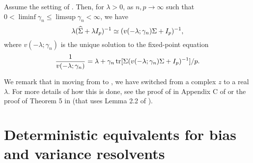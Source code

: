 \documentclass{article}
\begin{document}
\begin{corollary}
    \label{cor:basic-ridge-resolvent-equivalent-in-v}
    Assume the setting of 
    .
    Then, for $\lambda > 0$,
    as $n, p \to \infty$
    such that $0 < \liminf \gamma_n \le \limsup \gamma_n < \infty$,
    we have
    \[
        \lambda ({\widehat{\Sigma}} + \lambda I_p)^{-1}
        \simeq
        (v(-\lambda; \gamma_n) \Sigma + I_p)^{-1},
    \]
    where $v(-\lambda; \gamma_n)$
    is the unique solution to the fixed-point equation
    \[
        \frac{1}{v(-\lambda; \gamma_n)}
        =
        \lambda
        + \gamma_n \operatorname{tr}[\Sigma (v(-\lambda; \gamma_n) \Sigma + I_p)^{-1}] / p.
    \]
\end{corollary}

We remark that in moving from 
to
,
we have switched from a complex $z$ to a real $\lambda$.
For more details of how this is done,
see the proof of 
in Appendix C of \cite{patil_2022}
or the proof of Theorem 5 in \cite{hastie2022surprises}
(that uses
Lemma 2.2 of
\cite{knowles_yin_2017}).


\section{Deterministic equivalents for bias and variance resolvents}
\end{document}
